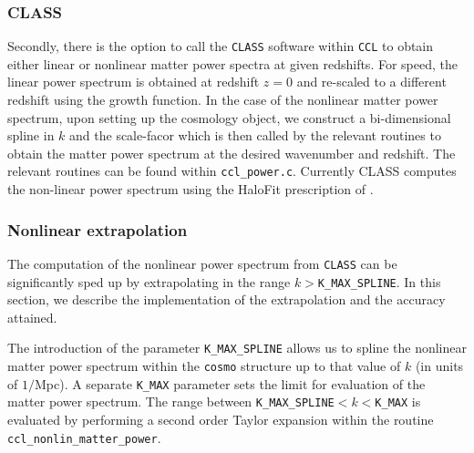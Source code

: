 \documentclass[\docopts]{\docclass}
\begin{document}
\subsubsection{CLASS}
Secondly, there is the option to call the {\tt CLASS} software \citep{class} within {\tt CCL} to obtain either linear or nonlinear matter power spectra at given redshifts. For speed, the linear power spectrum is obtained at redshift $z=0$ and re-scaled to a different redshift using the growth function. In the case of the nonlinear matter power spectrum, upon setting up the cosmology object, we construct a bi-dimensional spline in $k$ and the scale-facor which is then called by the relevant routines to obtain the matter power spectrum at the desired wavenumber and redshift. The relevant routines can be found within {\tt ccl\_power.c}. Currently CLASS computes the non-linear power spectrum using the HaloFit prescription of \cite{CLASS_halofit}.

\subsubsection{Nonlinear extrapolation}
\label{sec:NLextrapol}

The computation of the nonlinear power spectrum from {\tt CLASS} can be significantly sped up by extrapolating in the range $k>${\tt K\_MAX\_SPLINE}. In this section, we describe the implementation of the extrapolation and the accuracy attained.

The introduction of the parameter {\tt K\_MAX\_SPLINE} allows us to spline the nonlinear matter power spectrum within the {\tt cosmo} structure up to that value of $k$ (in units of $1/$Mpc). A separate {\tt K\_MAX} parameter sets the limit for evaluation of the matter power spectrum. The range between {\tt K\_MAX\_SPLINE}$<k<${\tt K\_MAX} is evaluated by performing a second order Taylor expansion within the routine {\tt ccl\_nonlin\_matter\_power}.
\end{document}
